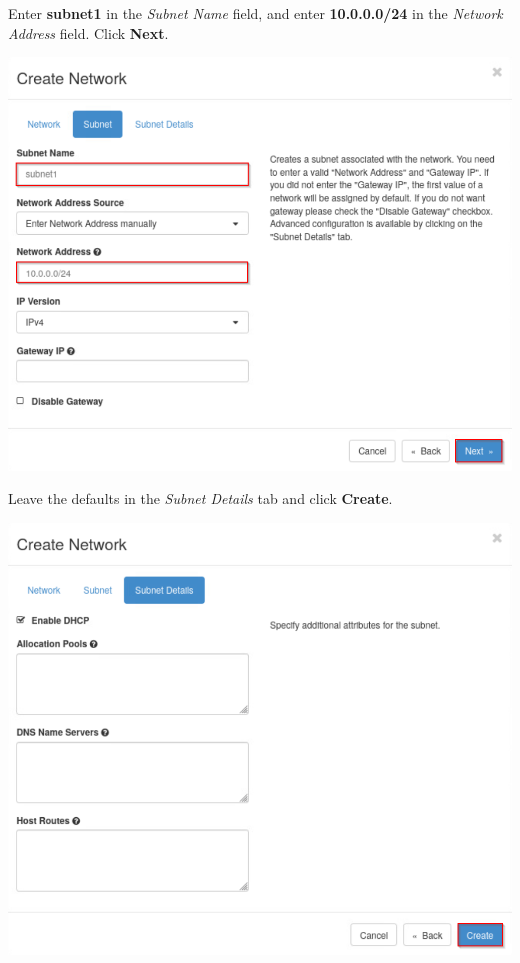 \documentclass[letterpaper, 12pt]{article}
\begin{document}
\begin{enumerate}
    \begin{labstep}
        Enter \textbf{subnet1} in the \textit{Subnet Name} field, and enter \textbf{10.0.0.0/24} in the \textit{Network Address} field.
        Click \textbf{Next}.

        \begin{center}
            \includegraphics[width=\linewidth]{images/part3/step6.png}
        \end{center}
    \end{labstep}

    \begin{labstep}
        Leave the defaults in the \textit{Subnet Details} tab and click \textbf{Create}.

        \begin{center}
            \includegraphics[width=\linewidth]{images/part3/step7.png}
        \end{center}
    \end{labstep}


\end{enumerate}
\end{document}
